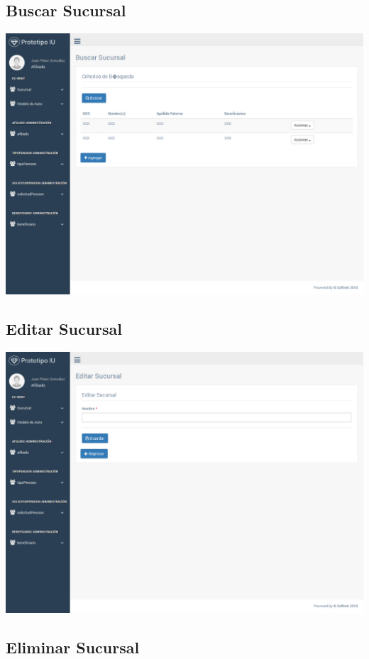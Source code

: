 \subsection{Buscar Sucursal}

\includegraphics[width=\linewidth]{ui-prototype/SucursalServices/BuscarSucursalPage.png}

\subsection{Editar Sucursal}

\includegraphics[width=\linewidth]{ui-prototype/SucursalServices/EditarSucursalPage.png}

\subsection{Eliminar Sucursal}

